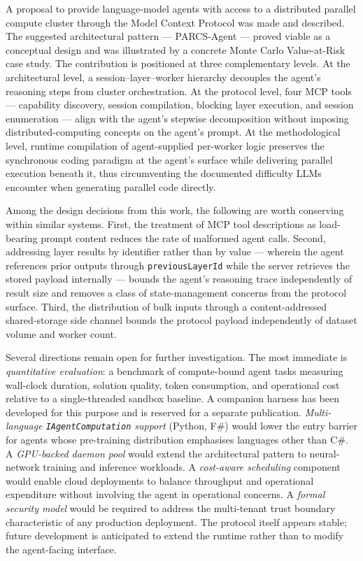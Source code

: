 

A proposal to provide language-model agents with access to a distributed parallel compute cluster through the Model Context Protocol was made and described. The suggested architectural pattern --- PARCS-Agent --- proved viable as a conceptual design and was illustrated by a concrete Monte Carlo Value-at-Risk case study. The contribution is positioned at three complementary levels. At the architectural level, a session--layer--worker hierarchy decouples the agent's reasoning steps from cluster orchestration. At the protocol level, four MCP tools --- capability discovery, session compilation, blocking layer execution, and session enumeration --- align with the agent's stepwise decomposition without imposing distributed-computing concepts on the agent's prompt. At the methodological level, runtime compilation of agent-supplied per-worker logic preserves the synchronous coding paradigm at the agent's surface while delivering parallel execution beneath it, thus circumventing the documented difficulty LLMs encounter when generating parallel code directly.

Among the design decisions from this work, the following are worth conserving within similar systems. First, the treatment of MCP tool descriptions as load-bearing prompt content reduces the rate of malformed agent calls. Second, addressing layer results by identifier rather than by value --- wherein the agent references prior outputs through \texttt{previousLayerId} while the server retrieves the stored payload internally --- bounds the agent's reasoning trace independently of result size and removes a class of state-management concerns from the protocol surface. Third, the distribution of bulk inputs through a content-addressed shared-storage side channel bounds the protocol payload independently of dataset volume and worker count.

Several directions remain open for further investigation. The most immediate is \textit{quantitative evaluation}: a benchmark of compute-bound agent tasks measuring wall-clock duration, solution quality, token consumption, and operational cost relative to a single-threaded sandbox baseline. A companion harness has been developed for this purpose and is reserved for a separate publication. \textit{Multi-language \texttt{IAgentComputation} support} (Python, F\#) would lower the entry barrier for agents whose pre-training distribution emphasises languages other than C\#. A \textit{GPU-backed daemon pool} would extend the architectural pattern to neural-network training and inference workloads. A \textit{cost-aware scheduling} component would enable cloud deployments to balance throughput and operational expenditure without involving the agent in operational concerns. A \textit{formal security model} would be required to address the multi-tenant trust boundary characteristic of any production deployment. The protocol itself appears stable; future development is anticipated to extend the runtime rather than to modify the agent-facing interface.
